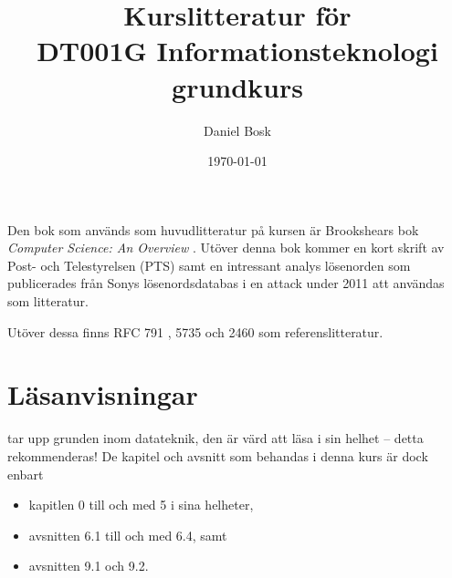\documentclass[a4paper,11pt,logo]{miunart}
\title{Kurslitteratur för\\DT001G Informationsteknologi grundkurs}
\author{Daniel Bosk}
\date{\today}
\begin{document}
\maketitle
\noindent
Den bok som används som huvudlitteratur på kursen är Brookshears bok 
\emph{Computer Science: An Overview} \citep{Brookshear2012csa}.
Utöver denna bok kommer en kort skrift av Post- och Telestyrelsen (PTS) 
\citep{PTStgr} samt en intressant analys \citep{Hunt2011abs} lösenorden som 
publicerades från Sonys lösenordsdatabas i en attack under 2011 att användas 
som litteratur.

Utöver dessa finns
RFC 791 \citep{RFC791},
5735 \citep{RFC5735} och
2460 \citep{RFC2460}
som referenslitteratur.


\section*{Läsanvisningar}
\noindent
\citet{Brookshear2012csa} tar upp grunden inom datateknik, den är värd att läsa 
i sin helhet -- detta rekommenderas!
De kapitel och avsnitt som behandas i denna kurs är dock enbart
\begin{itemize}
	\item kapitlen 0 till och med 5 i sina helheter,
	\item avsnitten 6.1 till och med 6.4, samt
	\item avsnitten 9.1 och 9.2.
\end{itemize}



\end{document}
